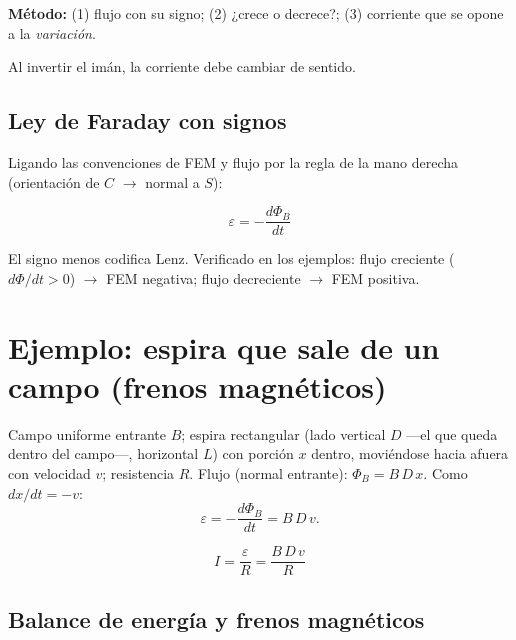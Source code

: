 \documentclass[12pt,a4paper]{article}
\begin{document}
\textbf{Método:} (1) flujo con su signo; (2) ¿crece o decrece?; (3) corriente
que se opone a la \emph{variación}.

\begin{notebox}
  Al invertir el imán, la corriente debe cambiar de sentido.
\end{notebox}



\subsection{Ley de Faraday con signos}

Ligando las convenciones de FEM y flujo por la regla de la mano derecha
(orientación de $C$ $\to$ normal a $S$):

\begin{keybox}
  \[
  \boxed{\varepsilon = -\frac{d\Phi_B}{dt}}
  \]
\end{keybox}

El signo menos codifica Lenz. Verificado en los ejemplos: flujo creciente
($d\Phi/dt>0$) $\to$ FEM negativa; flujo decreciente $\to$ FEM positiva.

\section{Ejemplo: espira que sale de un campo (frenos magnéticos)}

Campo uniforme entrante $B$; espira rectangular (lado vertical $D$ ---el que
queda dentro del campo---, horizontal $L$) con porción $x$ dentro, moviéndose hacia afuera con velocidad $v$;
resistencia $R$. Flujo (normal entrante): $\Phi_B = B\,D\,x$. Como
$dx/dt = -v$:
\[
\varepsilon = -\frac{d\Phi_B}{dt} = B\,D\,v.
\]

\begin{keybox}
  \[
  \boxed{I = \frac{\varepsilon}{R} = \frac{B\,D\,v}{R}}
  \]
\end{keybox}



\subsection{Balance de energía y frenos magnéticos}
\end{document}
